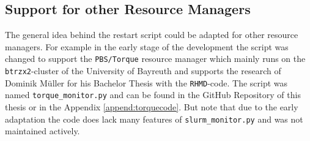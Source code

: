 
\subsection{Support for other Resource Managers}
\label{sub:generalSupport}

The general idea behind the restart script could be adapted for other resource managers. For example in the early stage of the development the script was changed to support the \texttt{PBS/Torque} resource manager which mainly runs on the \texttt{btrzx2}-cluster of the University of Bayreuth\cite{btrzx2} and supports the research of Dominik M{\"u}ller for his Bachelor Thesis\cite{Mueller2023} with the \texttt{RHMD}-code\cite{rmhd}. The script was named \texttt{torque\_monitor.py} and can be found in the GitHub Repository of this thesis\cite{torquemonitor} or in the Appendix \ref{append:torquecode}. But note that due to the early adaptation the code does lack many features of \texttt{slurm\_monitor.py} and was not maintained actively.